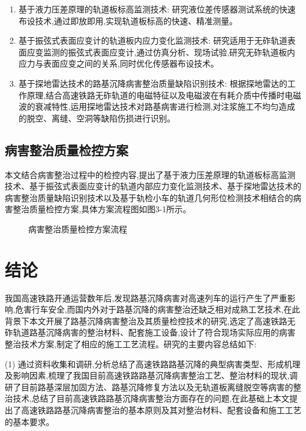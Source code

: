 \documentclass[a4paper,12pt]{ctexrep}
\begin{document}
\begin{enumerate}
    \item 基于液力压差原理的轨道板标高监测技术: 研究液位差传感器测试系统的快速布设技术,通过即放即用,实现轨道板标高的快速、精准测量。
    \item 基于振弦式表面应变计的轨道板内应力变化监测技术: 研究适用于无砟轨道表面应变监测的振弦式表面应变计,通过仿真分析、现场试验,研究无砟轨道板内应力与表面应变之间的关系,同时优化传感器布设技术。
    \item 基于探地雷达技术的路基沉降病害整治质量缺陷识别技术: 根据探地雷达的工作原理,结合高速铁路无砟轨道的电磁特征以及电磁波在有耗介质中传播时电磁波的衰减特性,运用探地雷达技术对路基病害进行检测,对注浆施工不均匀造成的脱空、离缝、空洞等缺陷伤损进行识别。
\end{enumerate}

\section{病害整治质量检控方案}

本文结合病害整治过程中的检控内容,提出了基于液力压差原理的轨道板标高监测技术、基于振弦式表面应变计的轨道内部应力变化监测技术、基于探地雷达技术的病害整治质量缺陷识别技术以及基于轨检小车的轨道几何形位检测技术相结合的病害整治质量检控方案,具体方案流程图如图3-1所示。

\begin{figure}[htbp]
    \centering
    \caption{病害整治质量检控方案流程}
    \label{fig:3-1}
\end{figure}

\chapter{结论}

我国高速铁路开通运营数年后,发现路基沉降病害对高速列车的运行产生了严重影响,危害行车安全,而国内外对于路基沉降的病害整治还缺乏相对成熟工艺技术,在此背景下本文开展了路基沉降病害整治及其质量检控技术的研究,选定了高速铁路无砟轨道路基沉降病害的整治材料、配套施工设备,设计了符合现场实际应用的病害整治技术方案,制定了相应的施工工艺流程。研究的主要内容总结如下:

(1) 通过资料收集和调研,分析总结了高速铁路路基沉降的典型病害类型、形成机理及影响因素,梳理了我国目前高速铁路路基沉降病害整治工艺、整治材料的现状,调研了目前路基深层加固方法、路基沉降修复方法以及无轨道板离缝脱空等病害的整治技术,总结了目前高速铁路路基沉降病害整治方面存在的问题,在此基础上本文提出了高速铁路路基沉降病害整治的基本原则及其对整治材料、配套设备和施工工艺的基本要求。
\end{document}
